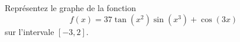 \begin{exercice}\label{exoMatlab0019}

Représentez le graphe de la fonction 
\[ f(x) = 37\tan(x^2)\sin(x^3) + \cos(3x) \]
sur l'intervale $[-3,2]$.

\end{exercice}
